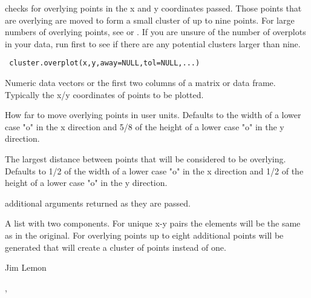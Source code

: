 \begin{Description}\relax
{} checks for overlying points in the x and y
coordinates passed. Those points that are overlying are moved to form
a small cluster of up to nine points. For large numbers of overlying
points, see  or .
If you are unsure of the number of overplots in your data, run
 first to see if there are any potential clusters
larger than nine.
\end{Description}
\begin{Usage}
\begin{verbatim}
 cluster.overplot(x,y,away=NULL,tol=NULL,...)
\end{verbatim}
\end{Usage}
\begin{Arguments}
\begin{ldescription}
\item[\code{x,y}] Numeric data vectors or the first two columns of a matrix
or data frame. Typically the x/y coordinates of points to be plotted.
\item[\code{away}] How far to move overlying points in user units. Defaults to
the width of a lower case "o" in the x direction and 5/8 of the
height of a lower case "o" in the y direction.
\item[\code{tol}] The largest distance between points that will be considered
to be overlying. Defaults to 1/2 of the width of a lower case "o" in 
the x direction and 1/2 of the height of a lower case "o" in the y 
direction.
\item[\code{...}] additional arguments returned as they are passed.
\end{ldescription}
\end{Arguments}
\begin{Value}
A list with two components. For unique x-y pairs the elements will be 
the same as in the original. For overlying points up to eight additional 
points will be generated that will create a cluster of points instead of one.
\end{Value}
\begin{Author}\relax
Jim Lemon
\end{Author}
\begin{SeeAlso}\relax
{},
\end{SeeAlso}
\begin{Examples}
\end{Examples}

